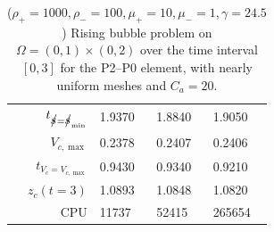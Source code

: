 \begin{table}
\begin{tabular}{rlll}
$t_{\strikes = \strikes_{\min}}$ & 1.9370 & 1.8840 & 1.9050 \\
$V_{c,\max}$                     & 0.2378 & 0.2407 & 0.2406 \\
$t_{V_c = V_{c,\max}}$           & 0.9430 & 0.9340 & 0.9210 \\
$z_c(t=3)$                       & 1.0893 & 1.0848 & 1.0820 \\
CPU                              &  11737 &  52415 & 265654 \\
\hline
\end{tabular}
\hspace*{-3.25cm}
\caption[Navier--Stokes 2d rising bubble benchmark values P2--P0]
{($\rho_+ = 1000,\rho_- = 100,\mu_+ = 10,\mu_- =1,\gamma = 24.5$)
Rising bubble problem on ${\Omega = (0,1) \times (0,2)}$ over the time interval
$[0,3]$ for the P2--P0 element, with nearly uniform meshes and
$C_a=20$\textdegree.}
\label{tab:risingbubble2Dp2p0}
\end{table}

